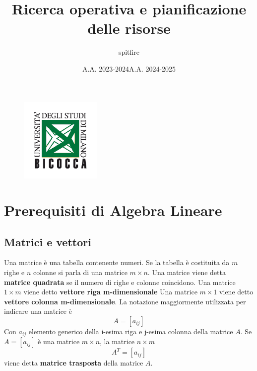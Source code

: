 \documentclass[12pt]{article}
\title{Ricerca operativa e pianificazione delle risorse}
\author{spitfire}
\date{A.A. 2023-2024}
\begin{document}
\begin{figure}
    \centering
    \includegraphics[width=0.35\textwidth]{Images/Logo scienze bicocca.png}
\end{figure}

\vspace{10cm}
\date{A.A. 2024-2025}


\maketitle

\newpage

\tableofcontents
\newpage

\section{Prerequisiti di Algebra Lineare}
\subsection{Matrici e vettori}
Una matrice è una tabella contenente numeri.
Se la tabella è costituita da $m$ righe e $n$ colonne si parla
di una matrice  $m \times n$. 
Una matrice viene detta \textbf{matrice quadrata} se il numero di righe
e colonne coincidono. \newline
Una matrice $1 \times m$ viene detto \textbf{vettore riga m-dimensionale} \newline
Una matrice $m \times 1$ viene detto \textbf{vettore colonna m-dimensionale}. \newline
La notazione maggiormente utilizzata per indicare una matrice è
$$A = [a_{ij}]$$
Con $a_{ij}$ elemento generico della i-esima riga e j-esima colonna della matrice $A$.
Se $A = [a_{ij}]$ è una matrice $m \times n$, la matrice $n \times m$
$$A^T=[a_{ij}]$$
viene detta \textbf{matrice trasposta} della matrice $A$.
\end{document}
